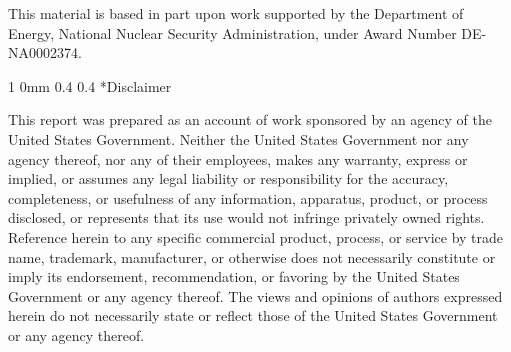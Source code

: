 \documentclass[11pt]{article}
\makeatletter
\renewcommand{\subsection}{\@startsection
{subsection}%
{1}%
{0mm}%
{0.4\baselineskip}%
{0.4\baselineskip}%
{\normalfont\large\bfseries\color{myBrown}}}%
\makeatother
\begin{document}
This material is based in part upon work supported by the Department
of Energy, National Nuclear Security Administration, under Award
Number DE-NA0002374.

\subsection*{Disclaimer}

This report was prepared as an account of work sponsored
by an agency of the United States Government. Neither the United
States Government nor any agency thereof, nor any of their
employees, makes any warranty, express or implied, or assumes any
legal liability or responsibility for the accuracy, completeness, or
usefulness of any information, apparatus, product, or process
disclosed, or represents that its use would not infringe privately
owned rights. Reference herein to any specific commercial
product, process, or service by trade name, trademark, manufacturer,
or otherwise does not necessarily constitute or imply its endorsement,
recommendation, or favoring by the United States Government or any
agency thereof.  The views and opinions of authors expressed herein do
not necessarily state or reflect those of the United States Government
or any agency thereof.
\end{document}
